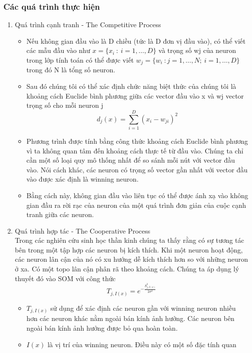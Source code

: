 	\subsubsection{Các quá trình thực hiện} 
	\begin{enumerate}
	  \item Quá trình cạnh tranh - The Competitive Process
	  \begin{itemize}
	    \item Nếu không gian đầu vào là D chiều (tức là D đơn vị đầu vào), có thể viết các
	  mẫu đầu vào như $x=\{x_i\::\:i=1,\dots,D\} $ và trọng số wj của neuron trong
	  lớp tính toán có thể được viết $w_j=\{w_i\::j=1,\dots,N;\:i=1,\dots,D\} $
	  trong đó N là tổng số neuron.
	  \item Sau đó chúng tôi có thể xác định chức năng biệt thức của
	  chúng tôi là khoảng cách Euclide bình phương giữa các vector đầu vào x và wj vector trọng số cho mỗi neuron j
	  \[ d_j(x) = \sum_{i=1}^D (x_i - w_{ji})^2 \]
	  \item Phương trình được tính bằng công thức khoảng cách Euclide bình phương
	  vì ta không quan tâm đến khoảng cách thực tế từ đầu vào. Chúng ta chỉ cần một số loại quy mô thống nhất để so sánh mỗi nút với vector đầu vào. Nói cách khác, các neuron có trọng số vector gần nhất với vector đầu vào được xác định là winning neuron.
	  \item Bằng cách này, không gian đầu vào liên tục có thể được ánh xạ vào không gian đầu ra rời rạc của neuron của một quá trình đơn giản của cuộc cạnh tranh giữa các neuron.
	  \end{itemize}
	  \item Quá trình hợp tác - The Cooperative Process\\
	  Trong các nghiên cứu sinh học thần kinh chúng ta thấy rằng có sự tương tác
	  bên trong một tập hợp các neuron bị kích thích. Khi một neuron hoạt động, các
	  neuron lân cận của nó có xu hướng dễ kích thích hơn so với những neuron ở
	  xa.
	  Có một topo lân cận phân rã theo khoảng cách. Chúng ta áp dụng lý thuyết đó
	  vào SOM với công thức
	  \[ T_{j,I(x)}=e^{-\frac{S_{j,I(x)}^2}{2\sigma^2}} \]
	  \begin{itemize}
	    \item $T_{j,I(x)}$ sử dụng để xác định các neuron gần với winning neuron
	    nhiều hơn các neuron khác nằm ngoài bán kính ảnh hưởng. Các neuron bên
	    ngoài bán kính ảnh hưởng được bỏ qua hoàn toàn.
	    \item $I(x)$ là vị trí của winning neuron. Điều này có một số đặc tính quan

\end{itemize}
\end{enumerate}
